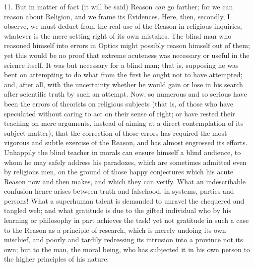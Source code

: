 11. But in matter of fact (it will be said) Reason \emph{can} go farther;
for we can reason about Religion, and we frame its Evidences. Here,
then, secondly, I observe, we must deduct from the real use of the
Reason in religious inquiries, whatever is the mere setting right of
its own mistakes. The blind man who reasoned himself into errors in
Optics might possibly reason himself out of them; yet this would be no
proof that extreme acuteness was necessary or useful in the science
itself. It was but necessary for a blind man; that is, supposing he
was bent on attempting to do what from the first he ought not to have
attempted; and, after all, with the uncertainty whether he would gain
or lose in his search after scientific truth by such an attempt. Now,
so numerous and so serious have been the errors of theorists on
religious subjects (that is, of those who have speculated without
caring to act on their sense of right; or have rested their teaching
on mere arguments, instead of aiming at a direct contemplation of its
subject-matter), that the correction of those errors has required the
most vigorous and subtle exercise of the Reason, and has almost
engrossed its efforts. Unhappily the blind teacher in morals can
ensure himself a blind audience, to whom he may safely address his
paradoxes, which are sometimes admitted even by religious men, on the
ground of those happy conjectures which his acute Reason now and then
makes, and which they can verify. What an indescribable confusion
hence arises between truth and falsehood, in systems, parties and
persons! What a superhuman talent is demanded to unravel the chequered
and tangled web; and what gratitude is due to the gifted individual
who by his learning or philosophy in part achieves the task! yet not
gratitude in such a case to the Reason as a principle of research,
which is merely undoing its own mischief, and poorly and tardily
redressing its intrusion into a province not its own; but to the man,
the moral being, who has subjected it in his own person to the higher
principles of his nature.


